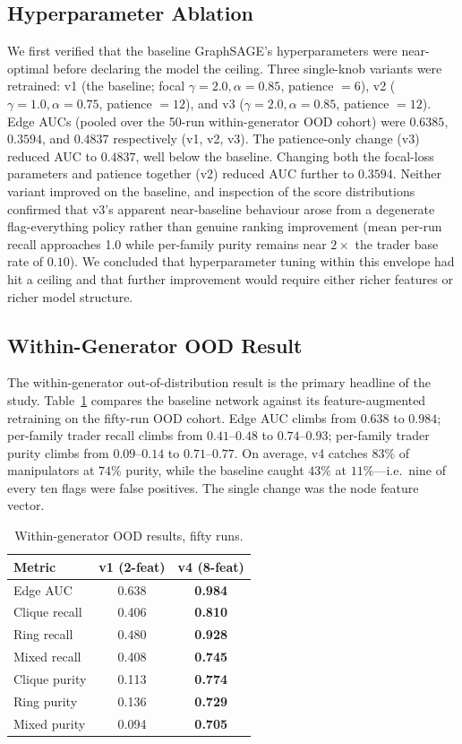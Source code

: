 \documentclass[10pt,twocolumn,letterpaper]{article}
\begin{document}
\subsection{Hyperparameter Ablation}
We first verified that the baseline GraphSAGE's hyperparameters were
near-optimal before declaring the model the ceiling. Three
single-knob variants were retrained: v1 (the baseline; focal
\(\gamma=2.0,\alpha=0.85\), patience \(=6\)), v2
(\(\gamma=1.0,\alpha=0.75\), patience \(=12\)), and v3
(\(\gamma=2.0,\alpha=0.85\), patience \(=12\)). Edge AUCs (pooled over
the 50-run within-generator OOD cohort) were \(0.6385\), \(0.3594\),
and \(0.4837\) respectively (v1, v2, v3). The patience-only change
(v3) reduced AUC to \(0.4837\), well below the baseline. Changing
both the focal-loss parameters and patience together (v2) reduced
AUC further to \(0.3594\). Neither variant improved on the baseline,
and inspection of the score distributions confirmed that v3's
apparent near-baseline behaviour arose from a degenerate
flag-everything policy rather than genuine ranking improvement
(mean per-run recall approaches 1.0 while per-family purity remains
near \(2\times\) the trader base rate of \(0.10\)). We concluded
that hyperparameter tuning within this envelope had hit a ceiling
and that further improvement would require either richer features
or richer model structure.

\subsection{Within-Generator OOD Result}
\label{sec:result-ood}
The within-generator out-of-distribution result is the primary headline
of the study. Table~\ref{tab:ood} compares the baseline network against
its feature-augmented retraining on the fifty-run OOD cohort. Edge AUC
climbs from \(0.638\) to \(0.984\); per-family trader recall climbs
from \(0.41\)--\(0.48\) to \(0.74\)--\(0.93\); per-family trader purity
climbs from \(0.09\)--\(0.14\) to \(0.71\)--\(0.77\). On average,
v4 catches \(83\%\) of manipulators at \(74\%\) purity, while the
baseline caught \(43\%\) at \(11\%\)---i.e.\ nine of every ten flags
were false positives. The single change was the node feature vector.

\begin{table}[t]
\caption{Within-generator OOD results, fifty runs.}
\label{tab:ood}
\centering
\begin{tabular}{lcc}
\toprule
Metric & v1 (2-feat) & v4 (8-feat) \\
\midrule
Edge AUC & 0.638 & \textbf{0.984} \\
Clique recall & 0.406 & \textbf{0.810} \\
Ring recall & 0.480 & \textbf{0.928} \\
Mixed recall & 0.408 & \textbf{0.745} \\
Clique purity & 0.113 & \textbf{0.774} \\
Ring purity & 0.136 & \textbf{0.729} \\
Mixed purity & 0.094 & \textbf{0.705} \\
\bottomrule
\end{tabular}
\end{table}
\end{document}

